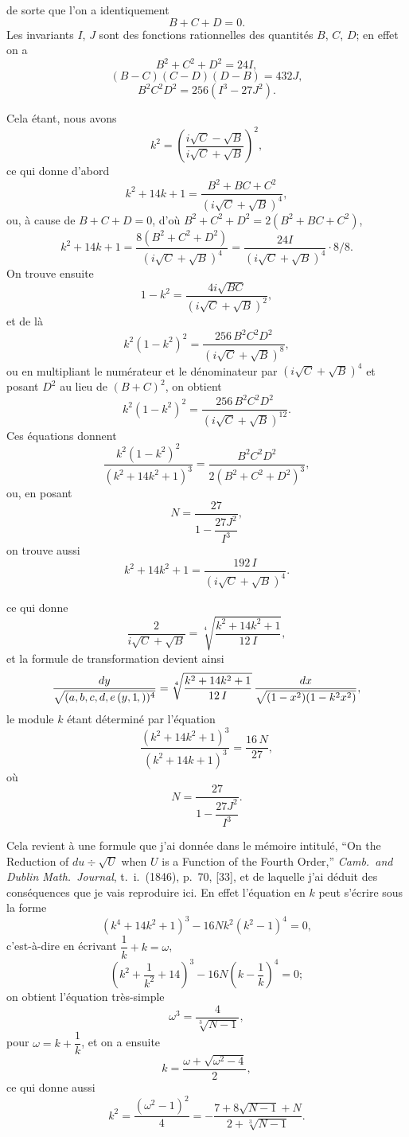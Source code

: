 \documentclass[11pt,a4paper]{article}
\newcommand{\fcn}[2]{(#1\kern-1pt, #2)}
\begin{document}
\setcounter{page}{61}

de sorte que l'on a identiquement
\[
B + C + D = 0.
\]
Les invariants $I$, $J$ sont des fonctions rationnelles des quantit\'es $B$, $C$, $D$;
en effet on a
\[
B^2 + C^2 + D^2 = 24 I,
\]
\[
(B-C)(C-D)(D-B) = 432 J,
\]
\[
B^2 C^2 D^2 = 256(I^3 - 27 J^2).
\]

Cela \'etant, nous avons
\[
k^2 = \left(\frac{i\sqrt{C} - \sqrt{B}}{i\sqrt{C} + \sqrt{B}}\right)^{\!2},
\]
ce qui donne d'abord
\[
k^2 + 14 k + 1 = \frac{B^2 + BC + C^2}{(i\sqrt{C} + \sqrt{B})^4},
\]
ou, \`a cause de $B+C+D=0$, d'o\`u $B^2 + C^2 + D^2 = 2(B^2 + BC + C^2)$,
\[
k^2 + 14 k + 1 = \frac{8(B^2 + C^2 + D^2)}{(i\sqrt{C} + \sqrt{B})^4} = \frac{24 I}{(i\sqrt{C} + \sqrt{B})^4} \cdot 8 / 8.
\]
On trouve ensuite
\[
1 - k^2 = \frac{4 i\sqrt{BC}}{(i\sqrt{C} + \sqrt{B})^2},
\]
et de l\`a
\[
k^2 (1 - k^2)^2 = \frac{256\,B^2 C^2 D^2}{(i\sqrt{C} + \sqrt{B})^8},
\]
ou en multipliant le num\'erateur et le d\'enominateur par $(i\sqrt{C} + \sqrt{B})^4$ et
posant $D^2$ au lieu de $(B+C)^2$, on obtient
\[
k^2 (1 - k^2)^2 = \frac{256\,B^2 C^2 D^2}{(i\sqrt{C} + \sqrt{B})^{12}}.
\]
Ces \'equations donnent
\[
\frac{k^2 (1 - k^2)^2}{(k^2 + 14 k^2 + 1)^3} = \frac{B^2 C^2 D^2}{2 (B^2 + C^2 + D^2)^3},
\]
ou, en posant
\[
N = \frac{27}{1 - \dfrac{27 J^2}{I^3}},
\]
on trouve aussi
\[
k^2 + 14 k^2 + 1 = \frac{192\,I}{(i\sqrt{C} + \sqrt{B})^4}.
\]

\setcounter{page}{62}

ce qui donne
\[
\frac{2}{i\sqrt{C} + \sqrt{B}} = \sqrt[4]{\frac{k^2 + 14 k^2 + 1}{12\,I}},
\]
et la formule de transformation devient ainsi
\[
\frac{dy}{\sqrt{(a,b,c,d,e\,\fcn{y,1})^4}} = \sqrt[4]{\frac{k^2 + 14 k^2 + 1}{12\,I}}\,\frac{dx}{\sqrt{(1-x^2)(1-k^2 x^2)}},
\]
le module $k$ \'etant d\'etermin\'e par l'\'equation
\[
\frac{(k^2 + 14 k^2 + 1)^3}{(k^2 + 14 k + 1)^3} = \frac{16\,N}{27},
\]
o\`u
\[
N = \frac{27}{1 - \dfrac{27 J^2}{I^3}}.
\]

Cela revient \`a une formule que j'ai donn\'ee dans le m\'emoire intitul\'e,
``On the Reduction of $du \div \sqrt{U}$ when $U$ is a Function of the Fourth Order,''
\textit{Camb.\ and Dublin Math.\ Journal}, t.~i.~(1846), p.~70, [33], et de laquelle
j'ai d\'eduit des cons\'equences que je vais reproduire ici. En effet l'\'equation
en $k$ peut s'\'ecrire sous la forme
\[
(k^4 + 14 k^2 + 1)^3 - 16 N k^2 (k^2 - 1)^4 = 0,
\]
c'est-\`a-dire en \'ecrivant $\dfrac{1}{k} + k = \omega$,
\[
\left(k^2 + \frac{1}{k^2} + 14\right)^{\!3} - 16 N \left(k - \frac{1}{k}\right)^{\!4} = 0;
\]
on obtient l'\'equation tr\`es-simple
\[
\omega^3 = \frac{4}{\sqrt[3]{N - 1}},
\]
pour $\omega = k + \dfrac{1}{k}$, et on a ensuite
\[
k = \frac{\omega + \sqrt{\omega^2 - 4}}{2},
\]
ce qui donne aussi
\[
k^2 = \frac{(\omega^2 - 1)^2}{4} = -\frac{7+8\sqrt{N-1} + N}{2 + \sqrt[3]{N-1}}.
\]
\end{document}
